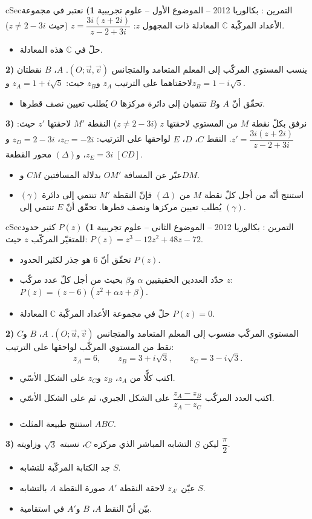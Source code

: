 \documentclass[12pt,a4paper]{article}
\newenvironment{BOX}[2]{\begin{otherlanguage}{english}\begin{arbox}{#1}{#2}}{\end{arbox}\end{otherlanguage}}
\newcounter{exo}
\newenvironment{tamrin}[1]{\stepcounter{exo}\begin{BOX}{cSec}{التمرين \theexo: #1}}{\end{BOX}}
\newenvironment{sq}{\begin{itemize}[leftmargin=2.4em,itemsep=3pt]}{\end{itemize}}
\newcommand{\qa}{\item[(أ)]}\newcommand{\qb}{\item[(ب)]}\newcommand{\qc}{\item[(جـ)]}\newcommand{\qd}{\item[(د)]}\newcommand{\qe}{\item[(هـ)]}
\begin{document}
\begin{tamrin}{بكالوريا 2012 -- الموضوع الأول -- علوم تجريبية}
\textbf{1)} نعتبر في مجموعة الأعداد المركّبة $\mathbb{C}$ المعادلة ذات المجهول $z$:
$z=\dfrac{3i(z+2i)}{z-2+3i}$ (حيث $z\neq2-3i$).
\begin{itemize}
\item حلّ في $\mathbb{C}$ هذه المعادلة.
\end{itemize}
\textbf{2)} ينسب المستوي المركّب إلى المعلم المتعامد والمتجانس $(O;\vec u,\vec v)$. $A$، $B$ نقطتان لاحقتاهما على الترتيب $z_A$ و$z_B$ حيث: $z_A=1+i\sqrt5$ و$z_B=1-i\sqrt5$.
\begin{itemize}
\item تحقّق أنّ $A$ و$B$ تنتميان إلى دائرة مركزها $O$ يُطلب تعيين نصف قطرها.
\end{itemize}
\textbf{3)} نرفق بكلّ نقطة $M$ من المستوي لاحقتها $z$ ($z\neq2-3i$) النقطة $M'$ لاحقتها $z'$ حيث: $z'=\dfrac{3i(z+2i)}{z-2+3i}$.
النقط $C$، $D$، $E$ لواحقها على الترتيب: $z_C=-2i$، $z_D=2-3i$ و$z_E=3i$، و$(\Delta)$ محور القطعة $[CD]$.
\begin{sq}
\qa عبّر عن المسافة $OM'$ بدلالة المسافتين $CM$ و$DM$.
\qb استنتج أنّه من أجل كلّ نقطة $M$ من $(\Delta)$ فإنّ النقطة $M'$ تنتمي إلى دائرة $(\gamma)$ يُطلب تعيين مركزها ونصف قطرها. تحقّق أنّ $E$ تنتمي إلى $(\gamma)$.
\end{sq}
\end{tamrin}

\begin{tamrin}{بكالوريا 2012 -- الموضوع الثاني -- علوم تجريبية}
\textbf{1)} $P(z)$ كثير حدود للمتغيّر المركّب $z$ حيث: $P(z)=z^3-12z^2+48z-72$.
\begin{sq}
\qa تحقّق أنّ $6$ هو جذر لكثير الحدود $P(z)$.
\qb حدّد العددين الحقيقيين $\alpha$ و$\beta$ بحيث من أجل كلّ عدد مركّب $z$: $P(z)=(z-6)(z^2+\alpha z+\beta)$.
\qc حلّ في مجموعة الأعداد المركّبة $\mathbb{C}$ المعادلة $P(z)=0$.
\end{sq}
\textbf{2)} المستوي المركّب منسوب إلى المعلم المتعامد والمتجانس $(O;\vec u,\vec v)$. $A$، $B$ و$C$ نقط من المستوي المركّب لواحقها على الترتيب:
\[z_A=6,\qquad z_B=3+i\sqrt3,\qquad z_C=3-i\sqrt3 .\]
\begin{sq}
\qa اكتب كلًّا من $z_A$، $z_B$ و$z_C$ على الشكل الأسّي.
\qb اكتب العدد المركّب $\dfrac{z_A-z_B}{z_A-z_C}$ على الشكل الجبري، ثم على الشكل الأسّي.
\qc استنتج طبيعة المثلث $ABC$.
\end{sq}
\textbf{3)} ليكن $S$ التشابه المباشر الذي مركزه $C$، نسبته $\sqrt3$ وزاويته $\dfrac{\pi}{2}$.
\begin{sq}
\qa جد الكتابة المركّبة للتشابه $S$.
\qb عيّن $z_{A'}$ لاحقة النقطة $A'$ صورة النقطة $A$ بالتشابه $S$.
\qc بيّن أنّ النقط $A$، $B$ و$A'$ في استقامية.
\end{sq}
\end{tamrin}
\end{document}
